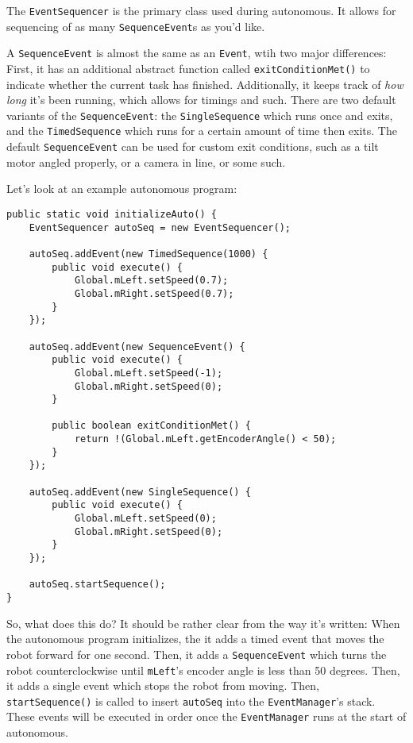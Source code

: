 \documentclass[a4paper]{article}
\begin{document}
The \lstinline{EventSequencer} is the primary class used during autonomous. It allows for sequencing of as many \lstinline{SequenceEvent}s as you'd like. 

A \lstinline{SequenceEvent} is almost the same as an \lstinline{Event}, wtih two major differences: First, it has an additional abstract function called \lstinline{exitConditionMet()} to indicate whether the current task has finished. Additionally, it keeps track of \textit{how long} it's been running, which allows for timings and such. There are two default variants of the \lstinline{SequenceEvent}: the \lstinline{SingleSequence} which runs once and exits, and the \lstinline{TimedSequence} which runs for a certain amount of time then exits. The default \lstinline{SequenceEvent} can be used for custom exit conditions, such as a tilt motor angled properly, or a camera in line, or some such.

Let's look at an example autonomous program:

\begin{lstlisting}
public static void initializeAuto() {
    EventSequencer autoSeq = new EventSequencer();

    autoSeq.addEvent(new TimedSequence(1000) {
        public void execute() {
            Global.mLeft.setSpeed(0.7);
            Global.mRight.setSpeed(0.7);
        }
    });

    autoSeq.addEvent(new SequenceEvent() {
        public void execute() {
            Global.mLeft.setSpeed(-1);
            Global.mRight.setSpeed(0);
        }

        public boolean exitConditionMet() {
            return !(Global.mLeft.getEncoderAngle() < 50);
        }
    });

    autoSeq.addEvent(new SingleSequence() {
        public void execute() {
            Global.mLeft.setSpeed(0);
            Global.mRight.setSpeed(0);
        }
    });

    autoSeq.startSequence();
}
\end{lstlisting}

So, what does this do? It should be rather clear from the way it's written: When the autonomous program initializes, the it adds a timed event that moves the robot forward for one second. Then, it adds a \lstinline{SequenceEvent} which turns the robot counterclockwise until \lstinline{mLeft}'s encoder angle is less than 50 degrees. Then, it adds a single event which stops the robot from moving. Then, \lstinline{startSequence()} is called to insert \lstinline{autoSeq} into the \lstinline{EventManager}'s stack. These events will be executed in order once the \lstinline{EventManager} runs at the start of autonomous.
\end{document}
